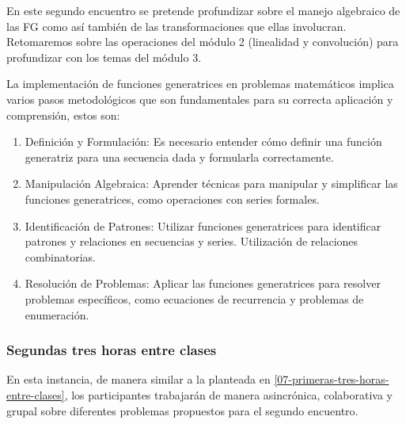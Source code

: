 En este segundo encuentro se pretende profundizar sobre el manejo algebraico de las FG como así también de las transformaciones que ellas involucran. Retomaremos sobre las operaciones del módulo 2 (linealidad y convolución) para profundizar con los temas del módulo 3.

La implementación de funciones generatrices en problemas matemáticos implica varios pasos metodológicos que son fundamentales para su correcta aplicación y comprensión, estos son:
\begin{enumerate}
	\item Definición y Formulación: Es necesario entender cómo definir una función generatriz para una secuencia dada y formularla correctamente.
	\item Manipulación Algebraica: Aprender técnicas para manipular y simplificar las funciones generatrices, como operaciones con series formales.
	\item Identificación de Patrones: Utilizar funciones generatrices para identificar patrones y relaciones en secuencias y series. Utilización de relaciones combinatorias.
	\item Resolución de Problemas: Aplicar las funciones generatrices para resolver problemas específicos, como ecuaciones de recurrencia y problemas de enumeración.
\end{enumerate}

\subsubsection{Segundas tres horas entre clases}

En esta instancia, de manera similar a la planteada en \ref{07-primeras-tres-horas-entre-clases}, los participantes trabajarán de manera asincrónica, colaborativa y grupal sobre diferentes problemas propuestos para el segundo encuentro.

